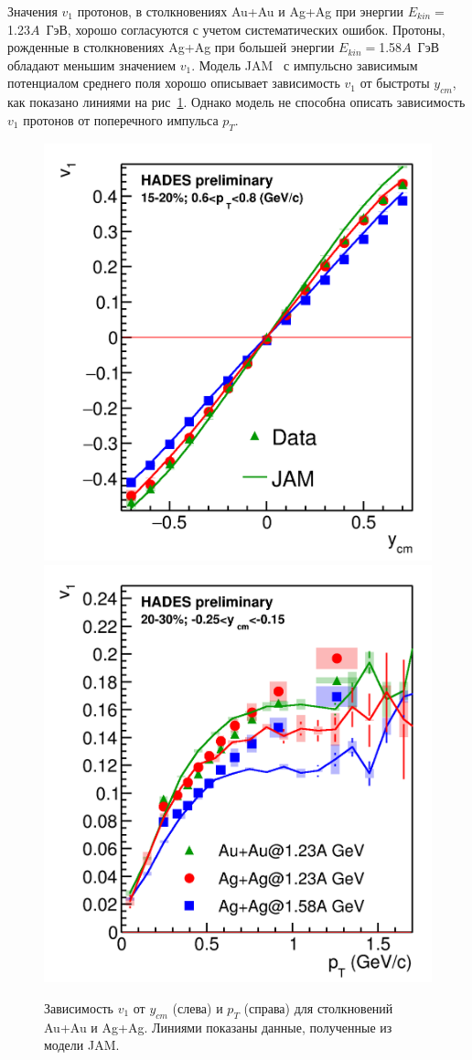 Значения $v_1$ протонов, в столкновениях Au+Au и Ag+Ag при  энергии $E_{kin}=$1.23$A$~ГэВ, хорошо согласуются с учетом систематических ошибок. 
Протоны, рожденные в столкновениях Ag+Ag при большей энергии $E_{kin}=$1.58$A$~ГэВ обладают меньшим значением $v_1$.
Модель JAM~\cite{nara2019jam} с импульсно зависимым потенциалом среднего поля хорошо описывает зависимость $v_1$ от быстроты $y_{cm}$, как показано линиями на рис~\ref{fig:hades_v1_ycm_pT}. 
Однако модель не способна описать зависимость $v_1$ протонов от поперечного импульса $p_T$.
%
\begin{figure}[h]
\begin{center}
\includegraphics[width=0.38\linewidth]{images/v1_hades_ycm.png}
\includegraphics[width=0.38\linewidth]{images/v1_hades_pT.png}
\caption{Зависимость $v_1$ от  $y_{cm}$ (слева)  и $p_T$ (справа) для столкновений Au+Au и Ag+Ag. Линиями показаны данные, полученные из модели JAM.}
\label{fig:hades_v1_ycm_pT}
\end{center}
\end{figure}

